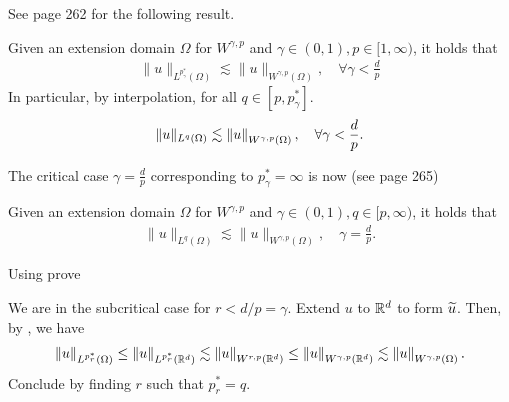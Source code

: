 \documentclass[
    a4paper,
    DIV=14,
    abstract=true,
    numbers=noenddot
]{scrartcl}
\begin{document}
See \cite{leoni2023first} page 262 for the following result.
\begin{theorem}\label{subcritical embedding}
    Given an extension domain $\Omega $ for $W^{\gamma,p}$ and $\gamma \in (0,1), p \in [1,\infty)$, it holds that
    \begin{align*}
        \|u\|_{L^{p_\gamma^*}(\Omega )} \lesssim \|u\|_{W^{\gamma, p}(\Omega )}, \quad\forall \gamma <  \frac{d}{p}
    \end{align*}
    In particular, by interpolation, for all $q \in [p,p_\gamma^*]$.
    \begin{align*}
        \|u\|_{L^{q}(\Omega )} \lesssim \left\lVert u \right\rVert_{W^{\gamma, p}(\Omega )}, \quad\forall \gamma <  \frac{d}{p}.
    \end{align*}
\end{theorem}
The critical case $\gamma=\frac{d}{p}$ corresponding to $p_\gamma^*=\infty$ is now (see \cite{leoni2023first} page 265)
\begin{theorem}\label{critical embedding}
    Given an extension domain $\Omega $ for $W^{\gamma,p}$ and  $\gamma \in (0,1), q \in [p,\infty)$, it holds that
    \begin{align*}
        \|u\|_{L^q(\Omega )} \lesssim\|u\|_{W^{\gamma, p}(\Omega)}, \quad \gamma =  \frac{d}{p}.
    \end{align*}
\end{theorem}
\begin{exercise}
    Using  prove 
\end{exercise}
\begin{hint}
    We are in the subcritical case for $r<d/p=\gamma$. Extend $u$ to $\mathbb{R}^d$ to form $\widetilde{u}$. Then, by , we have
    \begin{align*}
        \|u\|_{L^{p_r^*}(\Omega )}\leq \|u\|_{L^{p_r^*}(\mathbb{R}^d )}  \lesssim \left\lVert u \right\rVert_{W^{r, p}(\mathbb{R}^d )}\leq \left\lVert u \right\rVert_{W^{\gamma, p}(\mathbb{R}^d  )}\lesssim \left\lVert u \right\rVert_{W^{\gamma, p}(\Omega )}.
    \end{align*}
    Conclude by finding $r$ such that $p_r^*=q$.
\end{hint}
\end{document}
